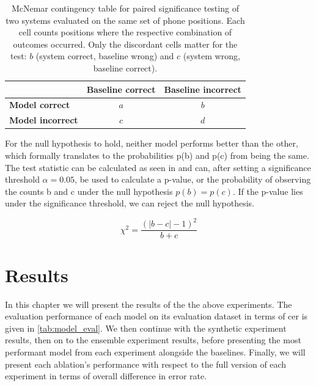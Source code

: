 \documentclass[thesis]{cluu}
\begin{document}
\begin{table}[h]
\centering
\begin{tabular}{lcc}
\toprule
 & \textbf{Baseline correct} & \textbf{Baseline incorrect} \\
\midrule
\textbf{Model correct} & $a$ & $b$ \\
\textbf{Model incorrect}   & $c$ & $d$ \\
\bottomrule
\end{tabular}
\caption{McNemar contingency table for paired significance testing of two systems evaluated on the same set of phone positions. Each cell counts positions where the respective combination of outcomes occurred. Only the discordant cells matter for the test: $b$ (system correct, baseline wrong) and $c$ (system wrong, baseline correct).}
\label{tab:mcnemar}
\end{table}

For the null hypothesis to hold, neither model performs better than the other, which formally translates to the probabilities p(b) and p(c) from  being the same. The test statistic can be calculated as seen in  and can, after setting a significance threshold $\alpha=0.05$, be used to calculate a p-value, or the probability of observing the counts b and c under the null hypothesis $p(b) = p(c)$. If the p-value lies under the significance threshold, we can reject the null hypothesis.

\begin{equation}
    \chi^{2}=\frac{(\lvert b-c\rvert-1)^2}{b+c}\label{eq:mcnemar}
\end{equation}

\chapter{Results}
In this chapter we will present the results of the the above experiments. The evaluation performance of each model on its evaluation dataset in terms of \gls{cer} is given in \cref{tab:model_eval}. We then continue with the synthetic experiment results, then on to the ensemble experiment results, before presenting the most performant model from each experiment alongside the baselines. Finally, we will present each ablation's performance with respect to the full version of each experiment in terms of overall difference in error rate.
\end{document}
